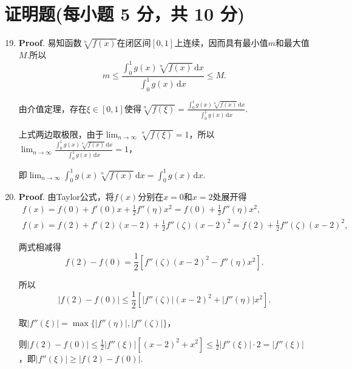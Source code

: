 \documentclass[../Main.tex]{subfiles}
\begin{document}
\section{证明题(每小题 5 分，共 10 分)}
\begin{enumerate}
    \setcounter{enumi}{18}
    \item \textbf{Proof}. 易知函数$\sqrt[n]{f(x)}$在闭区间$[0,1]$上连续，因而具有最小值$m$和最大值$M$.所以
          \[
              m\leq \frac{\displaystyle\int_{0}^{1}g(x)\sqrt[n]{f(x)}\,\mathrm{d}x}{\displaystyle\int_{0}^{1}g(x)\,\mathrm{d}x}
              \leq M.
          \]

          由介值定理，存在$\xi\in[0,1]$使得$\sqrt[n]{f(\xi)}=\frac{\displaystyle\int_{0}^{1}g(x)\sqrt[n]{f(x)}\,\mathrm{d}x}{\displaystyle\int_{0}^{1}g(x)\,\mathrm{d}x}$.

          上式两边取极限，由于$\lim_{n\to\infty}\sqrt[n]{f(\xi)}=1$，所以$\lim_{n\to\infty}
              \frac{\displaystyle\int_{0}^{1}g(x)\sqrt[n]{f(x)}\,\mathrm{d}x}{\displaystyle\int_{0}^{1}g(x)\,\mathrm{d}x}
              =1$，

          即$\lim_{n\to\infty}\int_{0}^{1}g(x)\sqrt[n]{f(x)}\,\mathrm{d}x=\int_{0}^{1}g
              (x)\,\mathrm{d}x$.

    \item \textbf{Proof}. 由Taylor公式，将$f(x)$分别在$x=0$和$x=2$处展开得
          \[
              \begin{gathered}
                  f(x)=f(0)+f'(0)x+\frac{1}{2}f''(\eta)x^2=f(0)+\frac{1}{2}f''(\eta)x^2,\\
                  f(x)=f(2)+f'(2)(x-2)+\frac{1}{2}f''(\zeta)(x-2)^2=f(2)+\frac{1}{2}f''(\zeta)(x-2)^2,
              \end{gathered}
          \]

          两式相减得
          \[
              f(2)-f(0)=\frac{1}{2}\left[f''(\zeta)(x-2)^{2}-f''(\eta)x^{2}\right].
          \]

          所以
          \[
              |f(2)-f(0)|\leq\frac{1}{2}\left[\left|f''(\zeta)\right|(x-2)^{2}+\left|f''(\eta)\right|x^{2}\right].
          \]

          取$|f''(\xi)|=\max\{|f''(\eta)|,|f''(\zeta)|\}$，

          则$|f(2)-f(0)|\leq\frac{1}{2}|f''(\xi)|\left[(x-2)^{2}+x^{2}\right]\leq \frac{1}{2}
              |f''(\xi)|\cdot 2=|f''(\xi)|$，即$|f''(\xi)|\geq|f(2)-f(0)|$.
\end{enumerate}
\end{document}
